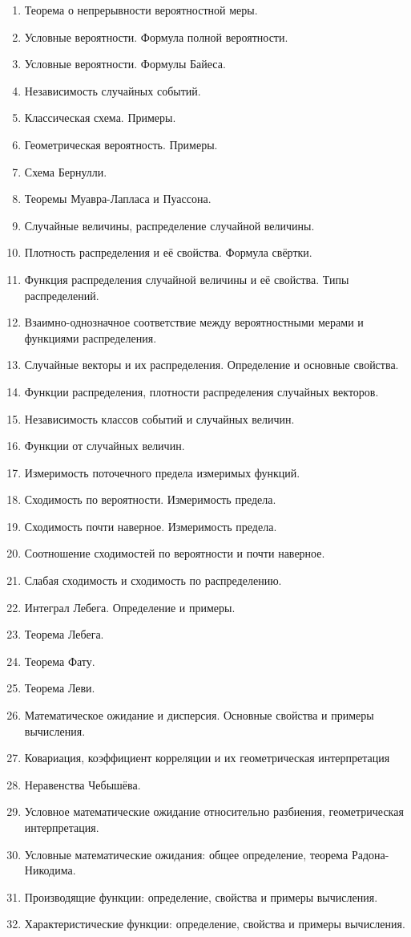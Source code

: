 \documentclass[a4paper]{article}
\theoremstyle{definition}
\theoremstyle{remark}
\begin{document}
\begin{enumerate}
    \item Теорема о непрерывности вероятностной меры.
    \item Условные вероятности. Формула полной вероятности.
    \item Условные вероятности. Формулы Байеса.
    \item Независимость случайных событий. 
    \item Классическая схема. Примеры. 
    \item Геометрическая вероятность. Примеры.
    \item Схема Бернулли. 
    \item Теоремы Муавра-Лапласа и Пуассона.
    \item Случайные величины, распределение случайной величины.
    \item Плотность распределения и её свойства. Формула свёртки.
    \item Функция распределения случайной величины и её свойства. Типы распределений.
    \item Взаимно-однозначное соответствие между вероятностными мерами и функциями распределения. 
    \item Случайные векторы и их распределения. Определение и основные свойства.
    \item Функции распределения, плотности распределения случайных векторов.
    \item Независимость классов событий и случайных величин. 
    \item Функции от случайных величин.
    \item Измеримость поточечного предела измеримых функций.
    \item Сходимость по вероятности. Измеримость предела.
    \item Сходимость почти наверное. Измеримость предела.
    \item Соотношение сходимостей по вероятности и почти наверное.
    \item 
    Слабая сходимость и сходимость по распределению.
    \item Интеграл Лебега. Определение и примеры.
    \item Теорема Лебега.
    \item Теорема Фату.
    \item Теорема Леви.
    \item Математическое ожидание и дисперсия. Основные свойства и примеры вычисления.
    \item Ковариация, коэффициент корреляции и их геометрическая интерпретация
    \item Неравенства Чебышёва.
    \item Условное математические ожидание относительно разбиения, геометрическая интерпретация.
    \item Условные математические ожидания: общее определение, теорема Радона-Никодима.
    \item Производящие функции: определение, свойства и примеры вычисления.
    \item Характеристические функции: определение, свойства и примеры вычисления.
\end{enumerate}
\end{document}
